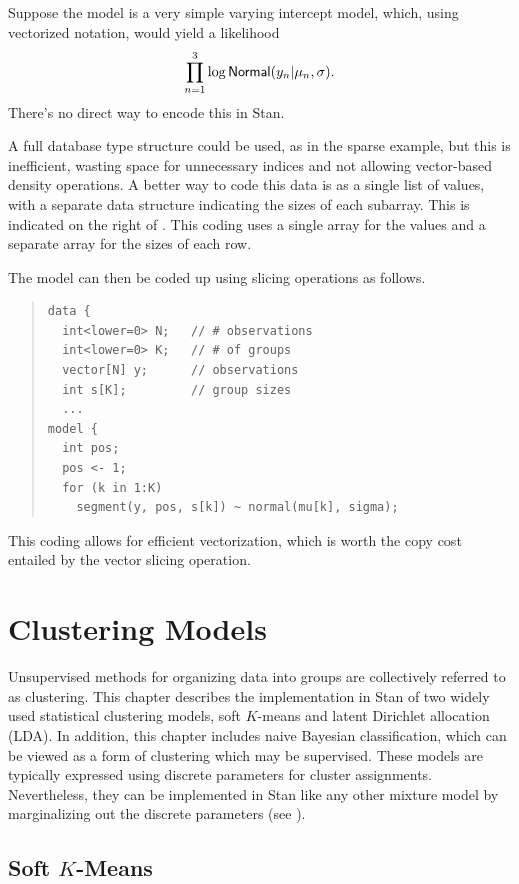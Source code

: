 Suppose the model is a very simple varying intercept model, which,
using vectorized notation, would yield a likelihood
\[
\prod_{n=1}^3 \log \distro{Normal}(y_n | \mu_n, \sigma).
\]
There's no direct way to encode this in Stan.  

A full database type structure could be used, as in the sparse
example, but this is inefficient, wasting space for unnecessary
indices and not allowing vector-based density operations.  A better
way to code this data is as a single list of values, with a separate
data structure indicating the sizes of each subarray.  This is
indicated on the right of .  This coding uses a
single array for the values and a separate array for the sizes of each
row.  

The model can then be coded up using slicing operations as follows.
\begin{quote}
\begin{Verbatim}
data {
  int<lower=0> N;   // # observations
  int<lower=0> K;   // # of groups
  vector[N] y;      // observations
  int s[K];         // group sizes
  ...
model {
  int pos;
  pos <- 1;
  for (k in 1:K)
    segment(y, pos, s[k]) ~ normal(mu[k], sigma);
\end{Verbatim}
\end{quote}
%
This coding allows for efficient vectorization, which is worth the
copy cost entailed by the  vector slicing operation.


\chapter{Clustering Models}\label{clustering.chapter}

\noindent
Unsupervised methods for organizing data into groups are collectively
referred to as clustering.  This chapter describes the implementation
in Stan of two widely used statistical clustering models, soft
$K$-means and latent Dirichlet allocation (LDA).  In addition, this
chapter includes naive Bayesian classification, which can be viewed as
a form of clustering which may be supervised.  These models are
typically expressed using discrete parameters for cluster assignments.
Nevertheless, they can be implemented in Stan like any other mixture
model by marginalizing out the discrete parameters (see
).

\section{Soft $K$-Means}


